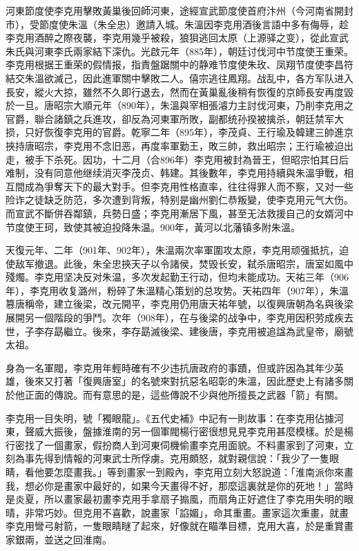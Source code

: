 河東節度使李克用擊敗黃巢後回師河東，途經宣武節度使首府汴州（今河南省開封市），受節度使朱溫（朱全忠）邀請入城。朱溫因李克用酒後言語中多有侮辱，趁李克用酒醉之際夜襲，李克用幾乎被殺，狼狽逃回太原（上源驿之变），從此宣武朱氏與河東李氏兩家結下深仇。光啟元年（885年），朝廷讨伐河中节度使王重荣。李克用根据王重荣的假情报，指責盤踞關中的静难节度使朱玫、凤翔节度使李昌符結交朱溫欲滅己，因此進軍關中擊敗二人。僖宗逃往鳳翔。战乱中，各方军队进入長安，縱火大掠，雖然不久即行退去，然而在黃巢亂後稍有恢復的京師長安再度毀於一旦。唐昭宗大順元年（890年），朱溫與宰相張濬力主討伐河東，乃削李克用之官爵，聯合諸鎮之兵進攻，卻反為河東軍所敗，副都统孙揆被擒杀，朝廷禁军大损，只好恢復李克用的官爵。乾寧二年（895年），李茂貞、王行瑜及韓建三帥進京挾持唐昭宗，李克用不念旧恶，再度率軍勤王，敗三帥，救出昭宗；王行瑜被迫出走，被手下杀死。因功，十二月（合896年）李克用被封為晉王，但昭宗怕其日后难制，没有同意他继续消灭李茂贞、韩建。其後數年，李克用持續與朱溫爭戰，相互間成為爭奪天下的最大對手。但李克用性格直率，往往得罪人而不察，又对一些险诈之徒缺乏防范，多次遭到背叛，特别是幽州劉仁恭叛變，使李克用元气大伤。而宣武不斷併吞鄰鎮，兵勢日盛；李克用漸居下風，甚至无法救援自己的女婿河中节度使王珂，致使其被迫投降朱温。900年，黃河以北藩镇多附朱溫。

天復元年、二年（901年、902年），朱溫兩次率軍圍攻太原，李克用顽强抵抗，迫使敌军撤退。此後，朱全忠挾天子以令諸侯，焚毁长安，弑杀唐昭宗，唐室如風中殘燭。李克用坚决反对朱温，多次发起勤王行动，但均未能成功。天祐三年（906年），李克用收复潞州，粉碎了朱溫精心策划的总攻势。天祐四年（907年），朱溫篡唐稱帝，建立後梁，改元開平，李克用仍用唐天祐年號，以復興唐朝為名與後梁展開另一個階段的爭鬥。次年（908年），在与後梁的战争中，李克用因积劳成疾去世，子李存勗繼立。後來，李存勗滅後梁、建後唐，李克用被追諡為武皇帝，廟號太祖。

身為一名軍閥，李克用年輕時確有不少违抗唐政府的事蹟，但或許因為其年少英雄，後來又打著「復興唐室」的名號來對抗惡名昭彰的朱溫，因此歷史上有諸多關於他正面的傳說。而有意思的是，這些傳說不少與他所擅長之武器「箭」有關。

李克用一目失明，號「獨眼龍」。《五代史補》中記有一則故事：在李克用佔據河東，聲威大振後，盤據淮南的另一個軍閥楊行密很想見見李克用甚麼模樣。於是楊行密找了一個畫家，假扮商人到河東伺機偷畫李克用面貌。不料畫家到了河東，立刻為事先得到情報的河東武士所俘虜。克用頗怒，就對親信說：「我少了一隻眼睛，看他要怎麼畫我。」等到畫家一到殿內，李克用立刻大怒說道：「淮南派你來畫我，想必你是畫家中最好的，如果今天畫得不好，那麼這裏就是你的死地！」當時是炎夏，所以畫家最初畫李克用手拿扇子搧風，而扇角正好遮住了李克用失明的眼晴，非常巧妙。但克用不喜歡，說畫家「諂媚」，命其重畫。畫家這次重畫，就畫李克用彎弓射箭，一隻眼睛瞇了起來，好像就在瞄準目標，克用大喜，於是重賞畫家銀兩，並送之回淮南。

